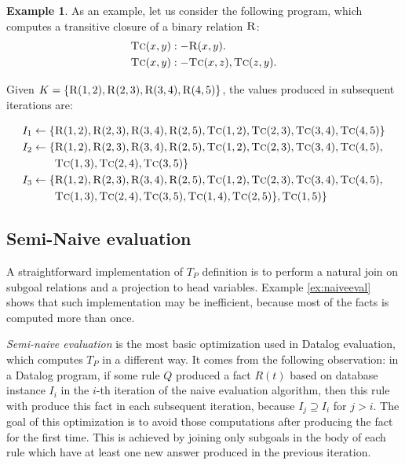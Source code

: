 \documentclass{pracamgr}
\theoremstyle{plain}
\theoremstyle{definition}
\newtheorem{exmp}{Example}[section]
\theoremstyle{remark}
\newcommand{\assign}{:-}
\newcommand{\relat}[2]{$\textsc{#1}#2$}
\begin{document}
\begin{exmp}
As an example, let us consider the following program, which computes a transitive closure of a binary relation \relat{R}{}:
\begin{align}
\textsc{Tc}(x, y) &\assign \textsc{R}(x, y).\\
\textsc{Tc}(x, y) &\assign \textsc{Tc}(x, z), \textsc{Tc}(z, y).
\end{align}

Given $K = \{\textsc{R}(1, 2), \textsc{R}(2, 3), \textsc{R}(3, 4), \textsc{R}(4, 5)\}$, the values produced in subsequent iterations are:

\begin{align*}
I_1 \leftarrow \{&\textsc{R}(1, 2), \textsc{R}(2, 3), \textsc{R}(3, 4), \textsc{R}(2, 5), \textsc{Tc}(1, 2), \textsc{Tc}(2, 3), \textsc{Tc}(3, 4), \textsc{Tc}(4, 5)\}\\
I_2 \leftarrow \{&\textsc{R}(1, 2), \textsc{R}(2, 3), \textsc{R}(3, 4), \textsc{R}(2, 5), \textsc{Tc}(1, 2), \textsc{Tc}(2, 3), \textsc{Tc}(3, 4), \textsc{Tc}(4, 5), \\
&\textsc{Tc}(1, 3), \textsc{Tc}(2, 4), \textsc{Tc}(3, 5)\}\\
I_3 \leftarrow \{&\textsc{R}(1, 2), \textsc{R}(2, 3), \textsc{R}(3, 4), \textsc{R}(2, 5), \textsc{Tc}(1, 2), \textsc{Tc}(2, 3), \textsc{Tc}(3, 4), \textsc{Tc}(4, 5),\\
& \textsc{Tc}(1, 3), \textsc{Tc}(2, 4), \textsc{Tc}(3, 5), \textsc{Tc}(1, 4), \textsc{Tc}(2, 5)\}, \textsc{Tc}(1, 5)\}\\
\end{align*}
\end{exmp}\label{ex:naiveeval}

\subsection{Semi-Naive evaluation}
A straightforward implementation of $T_P$ definition is to perform a natural join on subgoal relations and a projection to head variables. Example \ref{ex:naiveeval} shows that such implementation may be inefficient, because most of the facts is computed more than once.

\emph{Semi-naive evaluation} is the most basic optimization used in Datalog evaluation, which computes $T_P$ in a different way. It comes from the following observation: in a Datalog program, if some rule $Q$ produced a fact $R(t)$ based on database instance $I_i$ in the $i$-th iteration of the naive evaluation algorithm, then this rule with produce this fact in each subsequent iteration, because $I_j \supseteq I_i$ for $j > i$. The goal of this optimization is to avoid those computations after producing the fact for the first time. This is achieved by joining only subgoals in the body of each rule which have at least one new answer produced in the previous iteration. 
\end{document}
